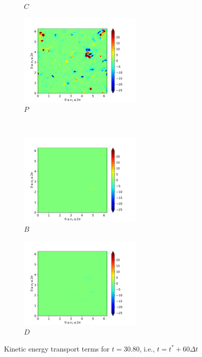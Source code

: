 \begin{figure}[H]
\begin{subfigure}{0.45\textwidth}
        \caption{$C$}
    \end{subfigure}
    \newline
    \begin{subfigure}{0.45\textwidth}
        \includegraphics[height=1.75in]{media/run-cds-65/P-ke-1400}
        \caption{$P$}
    \end{subfigure}
    ~
    \begin{subfigure}{0.45\textwidth}
        \includegraphics[height=1.75in]{media/run-cds-65/B-ke-1400}
        \caption{$B$}
    \end{subfigure}
    \newline
    \begin{subfigure}{0.45\textwidth}
        \includegraphics[height=1.75in]{media/run-cds-65/D-ke-1400}
        \caption{$D$}
    \end{subfigure}
    \caption{Kinetic energy transport terms for $t=30.80$, i.e., $t=t^{\ast} + 60 \Delta t$}
\end{figure}
